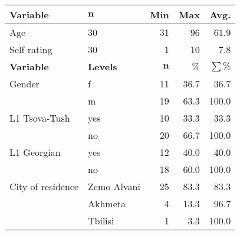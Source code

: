 \documentclass[portrait,fontscale=0.285,a0paper]{baposter2}
\begin{document}
\begin{poster}
{\begin{center}
{\footnotesize

  
\begin{tabular}{llrrr}
 \toprule
   \textbf{Variable} & $\mathbf{n}$ & \textbf{Min} & \textbf{Max} & \textbf{Avg.} \\ 
  \midrule
Age & 30 & 31 & 96 & 61.9 \\ 
  Self rating & 30 &  1 & 10 &  7.8 \\ \midrule
  
\textbf{Variable} & \textbf{Levels} & $\mathbf{n}$ & $\mathbf{\%}$ & $\mathbf{\sum \%}$ \\ 
  \midrule
Gender & f & 11 & 36.7 & 36.7 \\ 
   & m & 19 & 63.3 & 100.0 \\ 
L1 Tsova-Tush & yes & 10 & 33.3 & 33.3 \\ 
   & no & 20 & 66.7& 100.0 \\ 
L1 Georgian & yes & 12 & 40.0 & 40.0\\ 
   & no & 18& 60.0 & 100.0 \\ 
City of residence & Zemo Alvani & 25 & 83.3 & 83.3 \\ 
   & Akhmeta & 4 & 13.3 & 96.7 \\ 
   & Tbilisi & 1 & 3.3 & 100.0 \\ 
\bottomrule
\end{tabular}

  }
  \end{center}




}





\end{poster}
\end{document}
